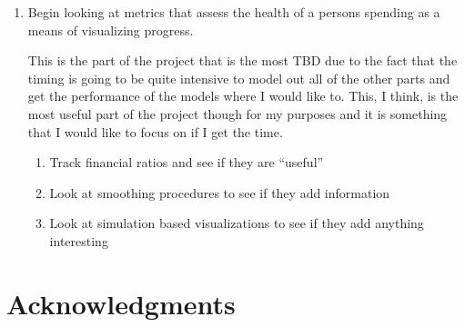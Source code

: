 \documentclass[11pt,a4paper]{article}
\newenvironment{updatematerial}{
\color{blue}
}{

}
\begin{document}
\begin{enumerate}
\begin{enumerate}
	\end{enumerate}
	\item Begin looking at metrics that assess the health of a persons spending as a means of visualizing progress. 
		\begin{updatematerial}
			This is the part of the project that is the most TBD due to the fact that the timing is going to be quite intensive to model out all of the other parts and get the performance of the models where I would like to. This, I think, is the most useful part of the project though for my purposes and it is something that I would like to focus on if I get the time. 
		\end{updatematerial}
	\begin{enumerate}
		\item Track financial ratios and see if they are ``useful''
		\item Look at smoothing procedures to see if they add information
		\item Look at simulation based visualizations to see if they add anything interesting
	\end{enumerate}
\end{enumerate}


%

\section*{Acknowledgments}
\end{document}
